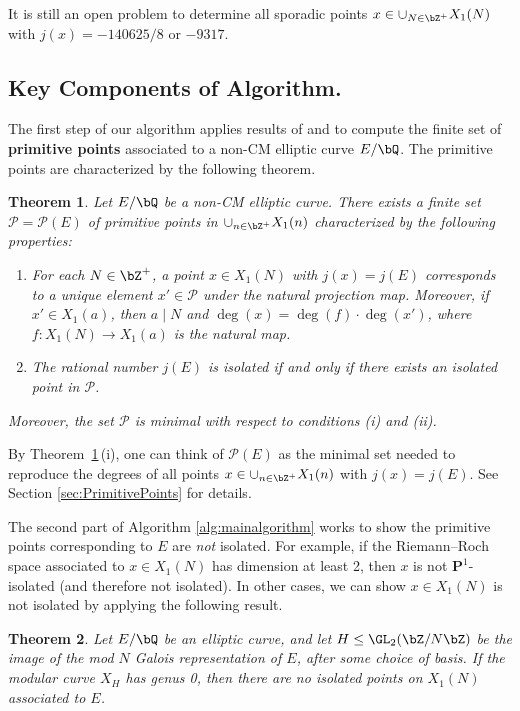\documentclass[11pt,reqno]{amsart}
\theoremstyle{plain}
\newtheorem{theorem}{Theorem}%
\theoremstyle{definition}
\newcommand{\Q}{\bQ}
\newcommand{\Z}{\bZ}
\newcommand{\PP}{\mathbf P}
\begin{document}
It is still an open problem to determine all sporadic points $x \in \cup_{N \in \Z^+} X_1(N)$ with $j(x) =-140625/8$ or $-9317$.

\subsection{Key Components of Algorithm.} The first step of our algorithm applies results of \cite{BELOV} and \cite{ZywinaAlgorithm} to compute the finite set of \textbf{primitive points} associated to a non-CM elliptic curve $E/\Q$. The primitive points are characterized by the following theorem.

\begin{theorem}\label{Thm:PrimPtsIntro}
Let $E/\Q$ be a non-CM elliptic curve.  There exists a finite set $\mathcal{P}=\mathcal{P}(E)$ of primitive points in $\cup_{n \in \Z^+} X_1(n)$ characterized by the following properties:
\begin{enumerate}
\item For each $N\in \Z^+$, a point $x \in X_1(N)$ with $j(x)=j(E)$ corresponds to a unique element $x' \in \mathcal{P}$ under the natural projection map. Moreover, if $x' \in X_1(a)$, then $a \mid N$ and $\deg(x)=\deg(f)\cdot \deg(x')$, where $f: X_1(N) \rightarrow X_1(a)$ is the natural map.
\item The rational number $j(E)$ is isolated if and only if there exists an isolated point in $\mathcal{P}$.
\end{enumerate}
Moreover, the set $\mathcal{P}$ is minimal with respect to conditions (i) and (ii).
\end{theorem} 
\noindent By Theorem~\ref{Thm:PrimPtsIntro}\,(i), one can think of $\mathcal{P}(E)$ as the minimal set needed to reproduce the degrees of all points $x \in \cup_{n \in \Z^+} X_1(n)$ with $j(x) = j(E)$. See Section \ref{sec:PrimitivePoints} for details.

The second part of Algorithm \ref{alg:mainalgorithm} works to show the primitive points corresponding to $E$ are \emph{not} isolated. For example, if the Riemann--Roch space associated to $x \in X_1(N)$ has dimension at least 2, then $x$ is not $\PP^1$-isolated (and therefore not isolated). In other cases, we can show $x \in X_1(N)$ is not isolated by applying the following result.

\begin{theorem} \label{Prop:Genus0Intro}
Let $E/\Q$ be an elliptic curve, and let $H \leq \GL_2(\Z/N\Z)$ be the image of the mod $N$ Galois representation of $E$, after some choice of basis. If the modular curve $X_H$ has genus 0, then there are no isolated points on $X_1(N)$ associated to $E$.
\end{theorem}
\end{document}

